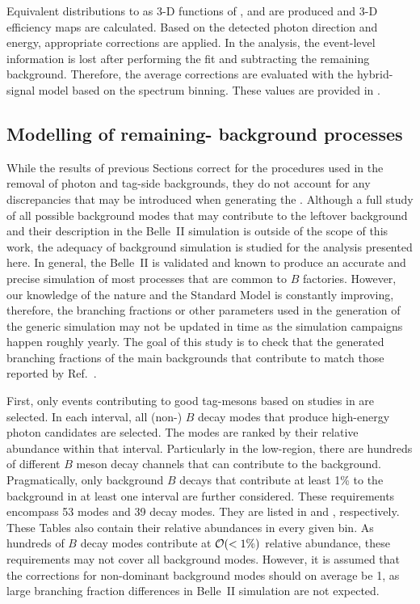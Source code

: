 Equivalent distributions to  as 3-D functions of \pRecoil, \pRecoilPhi and \pRecoilTheta are produced and 3-D efficiency maps are calculated.
Based on the detected photon direction and energy, appropriate corrections are applied.
In the \BtoXsgamma analysis, the event-level information is lost after performing the \Mbc fit and subtracting the remaining \BB background.
Therefore, the average corrections are evaluated with the \BtoXsgamma hybrid-signal model based on the \EB spectrum binning.
These values are provided in .

\subsection{Modelling of remaining-\texorpdfstring{\BB}{BB} background processes}\label{sec:remaining_bb_background_modelling}

While the results of previous Sections correct for the procedures used in the removal of photon and tag-side backgrounds, they do not account for any discrepancies that may be introduced when generating the \MC.
Although a full study of all possible background modes that may contribute to the leftover \BB background and their description in the Belle~II simulation is outside of the scope of this work, 
the adequacy of background simulation is studied for the analysis presented here.
In general, the Belle~II \MC is validated and known to produce an accurate and precise simulation of most processes that are common to $B$ factories.
However, our knowledge of the nature and the Standard Model is constantly improving, therefore, the branching fractions or other parameters used in the generation of the generic \BB simulation may not be updated in time as the simulation campaigns happen roughly yearly.
The goal of this study is to check that the generated branching fractions of the main backgrounds that contribute to \BtoXsgamma match those reported by Ref.~\cite{Workman:2022ynf}.

First, only events contributing to good tag-\B mesons based on studies in  are selected.
In each \EB interval, all (non-\BtoXsgamma) $B$ decay modes that produce high-energy photon candidates are selected.
The modes are ranked by their relative abundance within that \EB interval.
Particularly in the low-\EB region, there are hundreds of different $B$ meson decay channels that can contribute to the background.
Pragmatically, only background $B$ decays that contribute at least 1\% to the background in at least one \EB interval are further considered.
These requirements encompass 53 \Bp modes and 39 \Bz decay modes. 
They are listed in  and , respectively.
These Tables also contain their relative abundances in every given bin.
As hundreds of $B$ decay modes contribute at ${\cal O}(<1\%)$ relative abundance, these requirements may not cover all background modes. 
However, it is assumed that the corrections for non-dominant background modes should on average be 1, as large branching fraction differences in Belle~II simulation are not expected.

